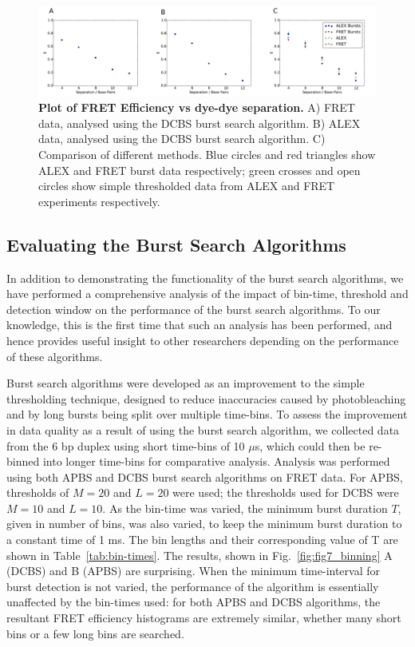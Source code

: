 \begin{figure}[!ht]
   \begin{center}
      \includegraphics*[clip=true, width=6in]{pyFRET/Bp_vs_E.pdf}
      \caption{{\bf Plot of FRET Efficiency vs dye-dye separation.} A) FRET data, analysed using the DCBS burst search algorithm. B) ALEX data, analysed using the DCBS burst search algorithm. C) Comparison of different methods. Blue circles and red triangles show ALEX and FRET burst data respectively; green crosses and open circles show simple thresholded data from ALEX and FRET experiments respectively.}
      \label{fig:fig6_Eplots}
   \end{center}
\end{figure}

\subsection{Evaluating the Burst Search Algorithms}
In addition to demonstrating the functionality of the burst search algorithms, we have performed a comprehensive analysis of the impact of bin-time, threshold and detection window on the performance of the burst search algorithms. To our knowledge, this is the first time that such an analysis has been performed, and hence provides useful insight to other researchers depending on the performance of these algorithms.

Burst search algorithms were developed as an improvement to the simple thresholding technique, designed to reduce inaccuracies caused by photobleaching and by long bursts being split over multiple time-bins. To assess the improvement in data quality as a result of using the burst search algorithm, we collected data from the 6 bp duplex using short time-bins of 10 $\mu$s, which could then be re-binned into longer time-bins for comparative analysis. Analysis was performed using both APBS and DCBS burst search algorithms on FRET data. For APBS, thresholds of $M=20$ and $L=20$ were used; the thresholds used for DCBS were $M = 10$ and $L = 10$. As the bin-time was varied, the minimum burst duration $T$, given in number of bins, was also varied, to keep the minimum burst duration to a constant time of 1 ms. The bin lengths and their corresponding value of T are shown in Table~\ref{tab:bin-times}. The results, shown in Fig.~\ref{fig:fig7_binning} A (DCBS) and B (APBS) are surprising. When the minimum time-interval for burst detection is not varied, the performance of the algorithm is essentially unaffected by the bin-times used: for both APBS and DCBS algorithms, the resultant FRET efficiency histograms are extremely similar, whether many short bins or a few long bins are searched.


